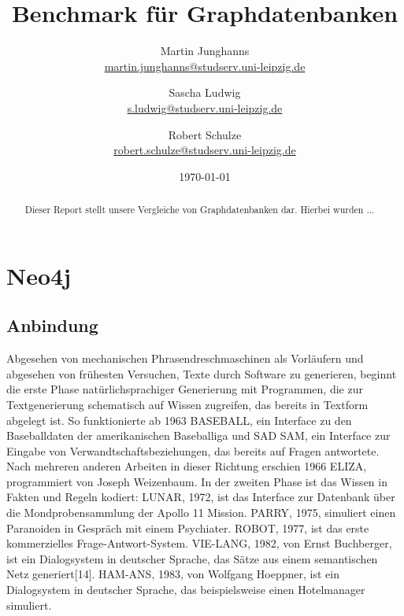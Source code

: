 \documentclass[11pt, a4paper, oneside, twocolumn]{article} %
\author{Martin Junghanns \\  \url{martin.junghanns@studserv.uni-leipzig.de} \and 
		Sascha Ludwig \\ \url{s.ludwig@studserv.uni-leipzig.de} \and 
		Robert Schulze \\ \url{robert.schulze@studserv.uni-leipzig.de} }
\date{\today}
\title{Benchmark für Graphdatenbanken}
\begin{document}
\renewcommand{\labelitemi}{-}

\maketitle

\begin{abstract}
	Dieser Report stellt unsere Vergleiche von Graphdatenbanken dar. Hierbei wurden ...
\end{abstract}

\section{Neo4j}
\subsection{Anbindung}


Abgesehen von mechanischen Phrasendreschmaschinen als Vorläufern und abgesehen von frühesten Versuchen, Texte durch Software zu generieren, beginnt die erste Phase natürlichsprachiger Generierung mit Programmen, die zur Textgenerierung schematisch auf Wissen zugreifen, das bereits in Textform abgelegt ist. So funktionierte ab 1963 BASEBALL, ein Interface zu den Baseballdaten der amerikanischen Baseballiga und SAD SAM, ein Interface zur Eingabe von Verwandtschaftsbeziehungen, das bereits auf Fragen antwortete. Nach mehreren anderen Arbeiten in dieser Richtung erschien 1966 ELIZA, programmiert von Joseph Weizenbaum. In der zweiten Phase ist das Wissen in Fakten und Regeln kodiert: LUNAR, 1972, ist das Interface zur Datenbank über die Mondprobensammlung der Apollo 11 Mission. PARRY, 1975, simuliert einen Paranoiden in Gespräch mit einem Psychiater. ROBOT, 1977, ist das erste kommerzielles Frage-Antwort-System. VIE-LANG, 1982, von Ernst Buchberger, ist ein Dialogsystem in deutscher Sprache, das Sätze aus einem semantischen Netz generiert[14]. HAM-ANS, 1983, von Wolfgang Hoeppner, ist ein Dialogsystem in deutscher Sprache, das beispielsweise einen Hotelmanager simuliert.
\end{document}
